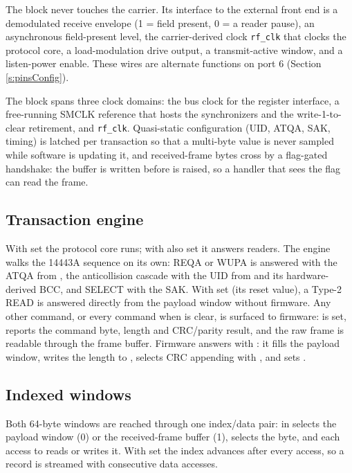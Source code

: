 The block never touches the carrier. Its interface to the external front end is a demodulated receive envelope (1 = field present, 0 = a reader pause), an asynchronous field-present level, the carrier-derived clock \texttt{rf\_clk} that clocks the protocol core, a load-modulation drive output, a transmit-active window, and a listen-power enable. These wires are alternate functions on port 6 (Section \ref{s:pinsConfig}).

The block spans three clock domains: the bus clock for the register interface, a free-running SMCLK reference that hosts the synchronizers and the write-1-to-clear retirement, and \texttt{rf\_clk}. Quasi-static configuration (UID, ATQA, SAK, timing) is latched per transaction so that a multi-byte value is never sampled while software is updating it, and received-frame bytes cross by a flag-gated handshake: the buffer is written before  is raised, so a handler that sees the flag can read the frame.

\subsection{Transaction engine}

With  set the protocol core runs; with  also set it answers readers. The engine walks the 14443A sequence on its own: REQA or WUPA is answered with the ATQA from , the anticollision cascade with the UID from  and its hardware-derived BCC, and SELECT with the SAK. With  set (its reset value), a Type-2 READ is answered directly from the payload window without firmware. Any other command, or every command when  is clear, is surfaced to firmware:  is set,  reports the command byte, length and CRC/parity result, and the raw frame is readable through the frame buffer. Firmware answers with : it fills the payload window, writes the length to , selects CRC appending with , and sets .

\subsection{Indexed windows}

Both 64-byte windows are reached through one index/data pair:  in  selects the payload window (0) or the received-frame buffer (1),  selects the byte, and each access to  reads or writes it. With  set the index advances after every access, so a record is streamed with consecutive data accesses.

